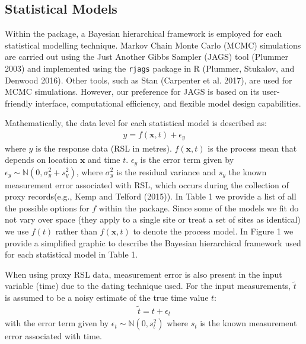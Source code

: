 \hypertarget{statisticalmodel}{%
\subsection{Statistical Models}\label{statisticalmodel}}

Within the  package, a Bayesian hierarchical framework is employed for each statistical modelling technique. Markov Chain Monte Carlo (MCMC) simulations are carried out using the Just Another Gibbs Sampler (JAGS) tool (Plummer 2003) and implemented using the \texttt{rjags} package in R (Plummer, Stukalov, and Denwood 2016). Other tools, such as Stan (Carpenter et al. 2017), are used for MCMC simulations. However, our preference for JAGS is based on its user-friendly interface, computational efficiency, and flexible model design capabilities.

Mathematically, the data level for each statistical model is described as:
\begin{align}
y = f(\mathbf{x},t) + \epsilon_y
\end{align}
where \(y\) is the response data (RSL in metres). \(f(\mathbf{x},t)\) is the process mean that depends on location \(\mathbf{x}\) and time \(t\). \(\epsilon_y\) is the error term given by \(\epsilon_y \sim \mathbb{N}(0, \sigma_y^2 + s_y^2)\), where \(\sigma_y^2\) is the residual variance and \(s_y\) the known measurement error associated with RSL, which occurs during the collection of proxy records(e.g., Kemp and Telford (2015)). In Table 1 we provide a list of all the possible options for \(f\) within the  package. Since some of the models we fit do not vary over space (they apply to a single site or treat a set of sites as identical) we use \(f(t)\) rather than \(f(\mathbf{x},t)\) to denote the process model. In Figure 1 we provide a simplified graphic to describe the Bayesian hierarchical framework used for each statistical model in Table 1.

When using proxy RSL data, measurement error is also present in the input variable (time) due to the dating technique used. For the input measurements, \(\tilde{t}\) is assumed to be a noisy estimate of the true time value \(t\):
\begin{align}
 \tilde{t} = t + \epsilon_t
\end{align}
with the error term given by \(\epsilon_t \sim \mathbb{N}(0, s_t^2)\) where \(s_t\) is the known measurement error associated with time.

